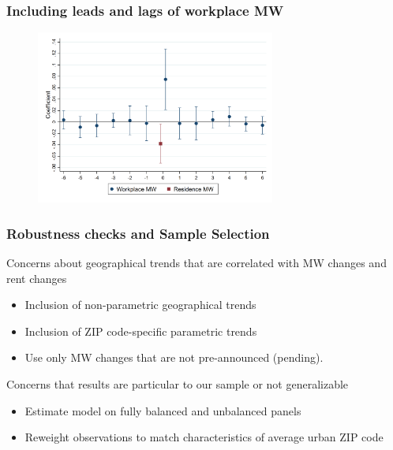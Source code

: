 \documentclass[aspectratio=169, t]{beamer}
\begin{document}
\begin{frame}[label = dyn_baseline_plot]
	\frametitle{Including leads and lags of workplace MW}

	\begin{figure}
		\centering
		\vspace{-2mm}
		\includegraphics[width=0.70\textwidth]{fd_baseline/output/fd_baseline_exp_ln_mw_17_dynamic.png}
	\end{figure}

	\hyperlink{dynamic_mw}{}
	\hyperlink{fd_both_dynamic}{}

	
\end{frame}

\begin{frame}[label = robus_sample]
	\frametitle{Robustness checks and Sample Selection}

	Concerns about geographical trends that are correlated with MW changes and rent changes	
	\begin{itemize}
		\item Inclusion of non-parametric geographical trends
		\item Inclusion of ZIP code-specific parametric trends
		\item Use only MW changes that are not pre-announced (pending).
	\end{itemize}
	\hyperlink{robustness_geo}{}

	\vspace{3mm}
	Concerns that results are particular to our sample or not generalizable
	\begin{itemize}
		\item Estimate model on fully balanced and unbalanced panels
		\item Reweight observations to match characteristics of average urban ZIP code
	\end{itemize}
	\hyperlink{robustness_geo}{}

\end{frame}
\end{document}
